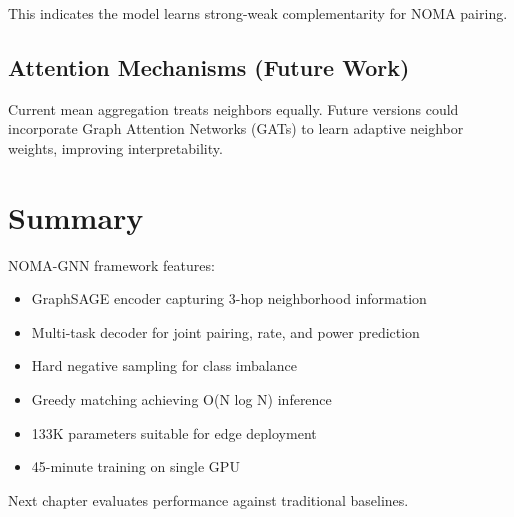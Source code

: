 This indicates the model learns strong-weak complementarity for NOMA pairing.

\subsection{Attention Mechanisms (Future Work)}

Current mean aggregation treats neighbors equally. Future versions could incorporate Graph Attention Networks (GATs) to learn adaptive neighbor weights, improving interpretability.

\section{Summary}

NOMA-GNN framework features:
\begin{itemize}
    \item GraphSAGE encoder capturing 3-hop neighborhood information
    \item Multi-task decoder for joint pairing, rate, and power prediction
    \item Hard negative sampling for class imbalance
    \item Greedy matching achieving O(N log N) inference
    \item 133K parameters suitable for edge deployment
    \item 45-minute training on single GPU
\end{itemize}

Next chapter evaluates performance against traditional baselines.
